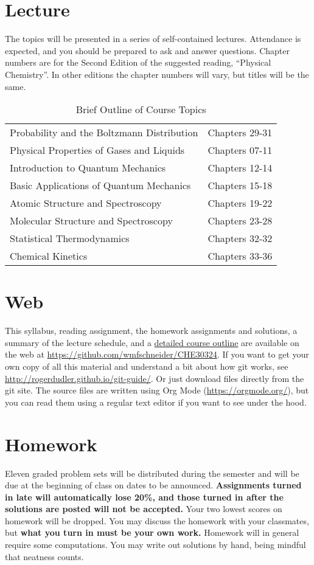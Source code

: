 \documentclass[11pt]{article}
\begin{document}
\section{Lecture}
\label{sec:org5017ca1}
The topics will be presented in a series of self-contained lectures. Attendance is expected, and you should be prepared to ask and answer questions. Chapter numbers are for the Second Edition of the suggested reading, ``Physical Chemistry''. In other editions the chapter numbers will vary, but titles will be the same. 

\begin{table}[htbp]
\caption{Brief Outline of Course Topics}
\centering
\begin{tabular}{ll}
\hline
Probability and the Boltzmann Distribution & Chapters 29-31\\
Physical Properties of Gases and Liquids & Chapters 07-11\\
Introduction to Quantum Mechanics & Chapters 12-14\\
Basic Applications of Quantum Mechanics & Chapters 15-18\\
Atomic Structure and Spectroscopy & Chapters 19-22\\
Molecular Structure and Spectroscopy & Chapters 23-28\\
Statistical Thermodynamics & Chapters 32-32\\
Chemical Kinetics & Chapters 33-36\\
\hline
\end{tabular}
\end{table}

\section{Web}
\label{sec:orgd0d9292}
This syllabus, reading assignment, the homework assignments and solutions, a summary of the lecture schedule, and a \href{https://github.com/wmfschneider/CHE30324/tree/master/Outline/CHE30324-outline.pdf}{detailed course outline} are available on the web at \url{https://github.com/wmfschneider/CHE30324}.  If you want to get your own copy of all this material and understand a bit about how git works, see \url{http://rogerdudler.github.io/git-guide/}.  Or just download files directly from the git site. The source files are written using Org Mode (\url{https://orgmode.org/}), but you can read them using a regular text editor if you want to see under the hood.

\section{Homework}
\label{sec:org5c49f77}
Eleven graded problem sets will be distributed during the semester and will be due at the beginning of class on dates to be announced.  \textbf{Assignments turned in late will automatically lose 20\%, and those turned in after the solutions are posted will not be accepted.}  Your two lowest scores on homework will be dropped.  You may discuss the homework with your classmates, but \textbf{what you turn in must be your own work.}
Homework will in general require some computations. You may write out solutions by hand, being mindful that neatness counts. 
\end{document}
